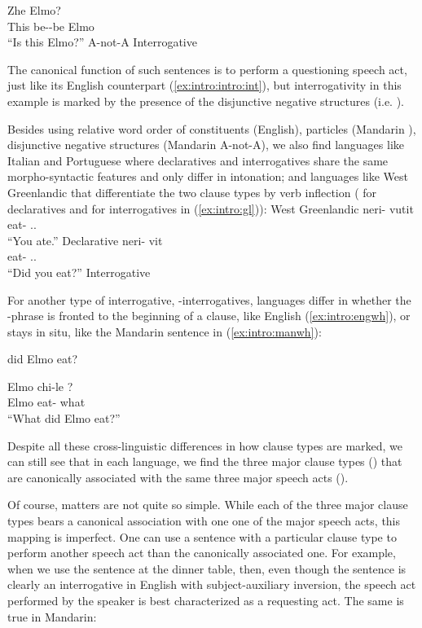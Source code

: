 \gll Zhe  Elmo?\\
This be-\Neg-be Elmo\\
``Is this Elmo?'' \hfill A-not-A Interrogative
\eex

The canonical function of such sentences is to perform a questioning speech act, just like its English counterpart (\ref{ex:intro:intro:int}), but interrogativity in this example is marked by the presence of the disjunctive negative structures (i.e. ). 

Besides using relative word order of constituents (English), particles (Mandarin ), disjunctive negative structures (Mandarin A-not-A), we also find languages like Italian and Portuguese where declaratives and interrogatives share the same morpho-syntactic features and only differ in intonation; and languages like West Greenlandic that differentiate the two clause types by verb inflection ( for declaratives and  for interrogatives in (\ref{ex:intro:gl})):
West Greenlandic
\bxl
\label{ex:intro:gl:dec}
\gll neri- vutit\\
eat- \Ind.\Ssg.\Pst{}\\
``You ate.'' \hfill Declarative
\ex \label{ex:intro:gl:int}
\gll neri- vit\\
eat- \Int.\Ssg.\Pst{}\\
``Did you eat?'' \hfill Interrogative
\exl
\hspace*{\fill} \cite[18, ex (50)]{konig2007}
\eex

For another type of interrogative, \twh-interrogatives, languages differ in whether the \twh-phrase is fronted to the beginning of a clause,  like English (\ref{ex:intro:engwh}), or stays in situ, like the Mandarin sentence in (\ref{ex:intro:manwh}):

 did Elmo eat?
\eex

\gll Elmo chi-le ?\\
Elmo eat-\Asp{} what\\
``What did Elmo eat?''
\eex

Despite all these cross-linguistic differences in how clause types are marked, we can still see that in each language, we find the three major clause types (\diis{}) that are canonically associated with the same three major speech acts (\aqrs{}). 

Of course, matters are not quite so simple. While each of the three major clause types bears a canonical association with one one of the major speech acts, this mapping is imperfect. One can use a sentence with a particular clause type to perform another speech act than the canonically associated one. For example, when we use the sentence  at the dinner table, then, even though the sentence is clearly an interrogative in English with subject-auxiliary inversion, the speech act performed by the speaker is best characterized as a requesting act. The same is true in Mandarin:

